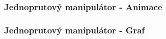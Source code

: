 \begin{frame}
	\frametitle{Jednoprutový manipulátor - Animace}
	\begin{figure}
		\centering
	\end{figure}
\end{frame}

\begin{frame}
	\frametitle{Jednoprutový manipulátor - Graf}
	
\end{frame}

% 	
